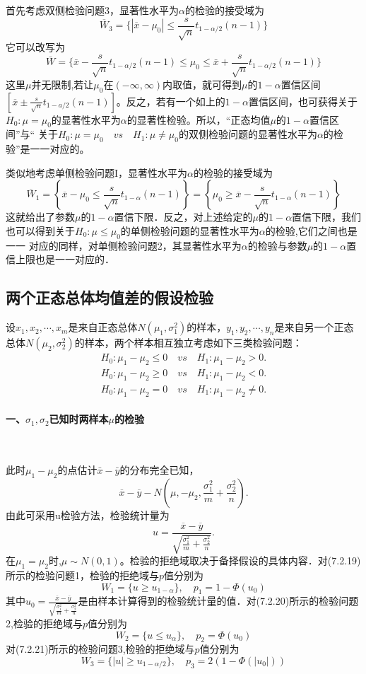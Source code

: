 首先考虑双侧检验问题3，显著性水平为$\alpha$的检验的接受域为
$$\overline{W}_3=\{| \overline{x}-\mu_{0}| \leq\frac{s}{\sqrt{n}}t_{1-\alpha/2}(n-1)\}$$
它可以改写为
$$
    \bar{W} = \{ \bar{x}-\frac{s}{\sqrt{n}}t_{1-\alpha/2}(n-1) \leq \mu_0 \leq \bar{x} +\frac{s}{\sqrt{n}}t_{1-\alpha/2}(n-1) \}
$$
这里$\mu$并无限制,若让$\mu_0$在$(-\infty,\infty)$内取值，就可得到$\mu$的$1-\alpha$置信区间$\left[\overline{x}\pm\frac{s}{\sqrt{n}}t_{1-a/2}(n-1)\right]$。反之，若有一个如上的$1-\alpha$置信区间，也可获得关于$H_0:\mu=\mu_0$的显著性水平为$\alpha$的显著性检验。所以，“正态均值$\mu$的$1-\alpha$置信区间”与“ 关于$H_0:\mu=\mu_0 \quad vs \quad H_1:\mu \neq \mu_0$的双侧检验问题的显著性水平为$\alpha$的检验”是一一对应的。

类似地考虑单侧检验问题I，显著性水平为$\alpha$的检验的接受域为
$$\overline{W}_{1}=\left\{\overline{x}-\mu_{0}\leqslant\frac{s}{\sqrt{n}}t_{1-\alpha}(n-1)\right\}=\left\{\mu_{0}\geqslant\overline{x}-\frac{s}{\sqrt{n}}t_{1-\alpha}(n-1)\right\}$$这就给出了参数$\mu$的$1-\alpha$置信下限．反之，对上述给定的$\mu$的$1-\alpha$置信下限，我们也可以得到关于$H_0:\mu\leq \mu_0$的单侧检验问题的显著性水平为$\alpha$的检验,它们之间也是一一
对应的同样，对单侧检验问题2，其显著性水平为$\alpha$的检验与参数$\mu$的$1-\alpha$置信上限也是一一对应的．
\subsection{两个正态总体均值差的假设检验}
设$x_{1},x_{2},\cdots,x_{m}$是来自正态总体$N(\mu_1,\sigma_1^2)$的样本，$y_{1},y_{2},\cdots,y_{n}$是来自另一个正态总体$N(\mu_2,\sigma_2^2)$的样本，两个样本相互独立考虑如下三类检验问题：
\begin{align}
    H_{0}:\mu_{1}-\mu_{2} \leq 0 \quad vs \quad H_{1}:\mu_{1}-\mu_{2}>0.      \\
    H_{0}:\mu_{1}-\mu_{2}\geqslant 0  \quad vs \quad H_{1}:\mu_{1}-\mu_{2}<0. \\
    H_{0}:\mu_{1}-\mu_{2}=0 \quad vs \quad H_{1}:\mu_{1}-\mu_{2}\neq0.
\end{align}
\paragraph{一、$\sigma_1,\sigma_2$已知时两样本$\mu$的检验}~{}

此时$\mu_1-\mu_2$的点估计$\bar{x}-\bar{y}$的分布完全已知，
$$\overline{x}-\overline{y}-N\left(\mu,-\mu_{2},\frac{\sigma_{1}^{2}}{m}+\frac{\sigma_{2}^{2}}{n}\right).$$
由此可采用u检验方法，检验统计量为
$$u=\frac{\overline{x}-\overline{y}}{\sqrt{\frac{\sigma_{1}^{2}}{m}+\frac{\sigma_{2}^{2}}{n}}}.$$
在$\mu_1=\mu_2$时,$\mu\sim N(0,1)$。检验的拒绝域取决于备择假设的具体内容．对(7.2.19)所示的检验问题1，检验的拒绝域与$p$值分别为
$$W_{1}=\{ u\geq u_{1-\alpha}\},\quad p_{1}=1-\Phi(u_{0})$$
其中$u_{0}=\frac{\overline{x}-\overline{y}}{\sqrt{\frac{\sigma_{1}^{2}}{m}+\frac{\sigma_{2}^{2}}{n}}}$是由样本计算得到的检验统计量的值．对(7.2.20)所示的检验问题2,检验的拒绝域与$p$值分别为
$$W_{2}=\{ u\leq u_{\alpha}\},\quad p_{2}=\Phi(u_{0})$$
对(7.2.21)所示的检验问题3,检验的拒绝域与$p$值分别为
$$W_{3}=\{ |u|\geq u_{1-\alpha/2}\},\quad p_{3}=2(1-\Phi(|u_{0}|))$$

